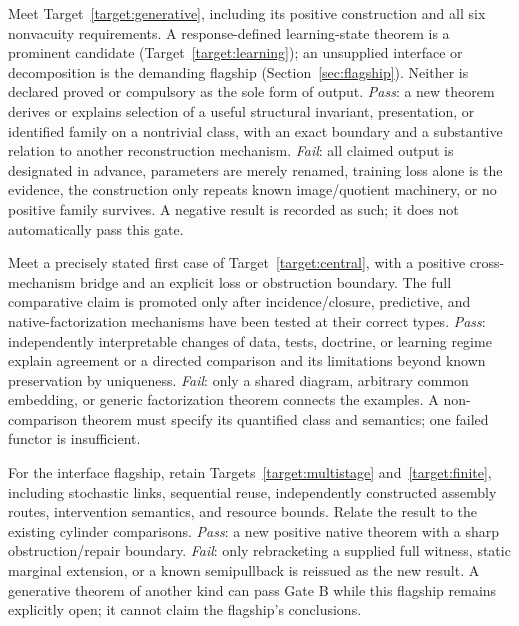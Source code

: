 \documentclass[11pt]{article}
\theoremstyle{remark}
\begin{document}
\begin{description}[style=nextline,leftmargin=0pt]
\item[Gate B \quad Establish a generative result]
Meet Target~\ref{target:generative}, including its positive construction and all six nonvacuity requirements. A response-defined learning-state theorem is a prominent candidate (Target~\ref{target:learning}); an unsupplied interface or decomposition is the demanding flagship (Section~\ref{sec:flagship}). Neither is declared proved or compulsory as the sole form of output. \emph{Pass}: a new theorem derives or explains selection of a useful structural invariant, presentation, or identified family on a nontrivial class, with an exact boundary and a substantive relation to another reconstruction mechanism. \emph{Fail}: all claimed output is designated in advance, parameters are merely renamed, training loss alone is the evidence, the construction only repeats known image/quotient machinery, or no positive family survives. A negative result is recorded as such; it does not automatically pass this gate.

\item[Gate C \quad Establish a comparative result]
Meet a precisely stated first case of Target~\ref{target:central}, with a positive cross-mechanism bridge and an explicit loss or obstruction boundary. The full comparative claim is promoted only after incidence/closure, predictive, and native-factorization mechanisms have been tested at their correct types. \emph{Pass}: independently interpretable changes of data, tests, doctrine, or learning regime explain agreement or a directed comparison and its limitations beyond known preservation by uniqueness. \emph{Fail}: only a shared diagram, arbitrary common embedding, or generic factorization theorem connects the examples. A non-comparison theorem must specify its quantified class and semantics; one failed functor is insufficient.

\item[Gate D \quad Establish native use where claimed]
For the interface flagship, retain Targets~\ref{target:multistage} and~\ref{target:finite}, including stochastic links, sequential reuse, independently constructed assembly routes, intervention semantics, and resource bounds. Relate the result to the existing cylinder comparisons. \emph{Pass}: a new positive native theorem with a sharp obstruction/repair boundary. \emph{Fail}: only rebracketing a supplied full witness, static marginal extension, or a known semipullback is reissued as the new result. A generative theorem of another kind can pass Gate B while this flagship remains explicitly open; it cannot claim the flagship's conclusions.


\end{description}
\end{document}
